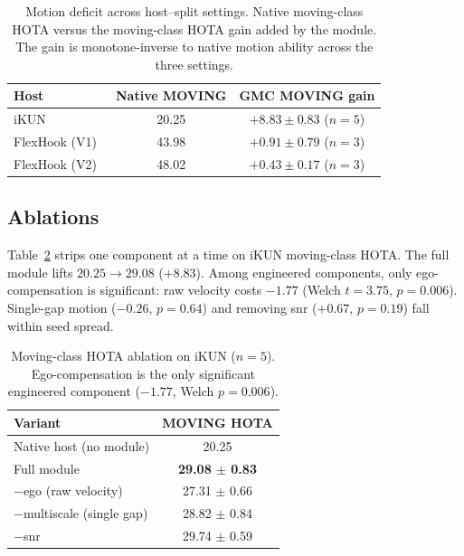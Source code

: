 \documentclass[sigconf,review,anonymous]{acmart}
\begin{document}
\begin{table}[t]
\centering
\caption{Motion deficit across host--split settings. Native moving-class HOTA versus the moving-class HOTA gain added by the module. The gain is monotone-inverse to native motion ability across the three settings.}
\label{tab:deficit}
\small
\begin{tabular}{lcc}
\toprule
Host & Native MOVING & GMC MOVING gain \\
\midrule
iKUN~\cite{ikun}             & 20.25 & $+8.83 \pm 0.83$ ($n{=}5$) \\
FlexHook (V1)~\cite{flexhook}  & 43.98 & $+0.91 \pm 0.79$ ($n{=}3$) \\
FlexHook (V2)~\cite{flexhook}  & 48.02 & $+0.43 \pm 0.17$ ($n{=}3$) \\
\bottomrule
\end{tabular}
\end{table}

\subsection{Ablations}
\label{sec:ablation}

Table~\ref{tab:ablation} strips one component at a time on iKUN moving-class HOTA. The full module lifts $20.25\to29.08$ ($+8.83$). Among engineered components, only ego-compensation is significant: raw velocity costs $-1.77$ (Welch $t{=}3.75$, $p{=}0.006$). Single-gap motion ($-0.26$, $p{=}0.64$) and removing snr ($+0.67$, $p{=}0.19$) fall within seed spread.

\begin{table}[t]
\centering
\caption{Moving-class HOTA ablation on iKUN ($n{=}5$). Ego-compensation is the only significant engineered component ($-1.77$, Welch $p{=}0.006$).}
\label{tab:ablation}
\small
\begin{tabular}{lc}
\toprule
Variant & MOVING HOTA \\
\midrule
Native host (no module)           & 20.25 \\
Full module                       & \textbf{29.08 $\pm$ 0.83} \\
\;\;$-$ego (raw velocity)         & 27.31 $\pm$ 0.66 \\
\;\;$-$multiscale (single gap)    & 28.82 $\pm$ 0.84 \\
\;\;$-$snr                        & 29.74 $\pm$ 0.59 \\
\bottomrule
\end{tabular}
\end{table}
\end{document}
